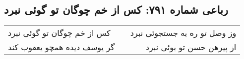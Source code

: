 \begin{center}
\section*{رباعی شماره ۷۹۱: کس از خم چوگان تو گوئی نبرد}
\label{sec:0791}
\begin{longtable}{l p{0.5cm} r}
کس از خم چوگان تو گوئی نبرد
&&
وز وصل تو ره به جستجوئی نبرد
\\
گر یوسف دیده همچو یعقوب کند
&&
از پیرهن حسن تو بوئی نبرد
\\
\end{longtable}
\end{center}
